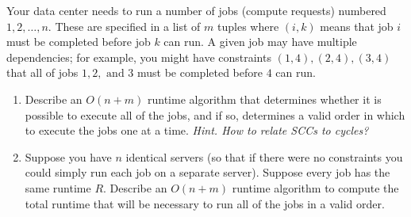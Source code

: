   \begin{exercise}
    Your data center needs to run a number of jobs (compute requests) numbered $1, 2, \dots, n$. These are specified in a list of $m$ tuples where $(i, k)$ means that job $i$ must be completed before job $k$ can run. A given job may have multiple dependencies; for example, you might have constraints $(1, 4), (2, 4), (3, 4)$ that all of jobs $1, 2, \mbox{ and } 3$ must be completed before $4$ can run.
    \begin{enumerate}
      \item Describe an $O(n+m)$ runtime algorithm that determines whether it is possible to execute all of the jobs, and if so, determines a valid order in which to execute the jobs one at a time. \textit{Hint. How to relate SCCs to cycles?}
      \item Suppose you have $n$ identical servers (so that if there were no constraints you could simply run each job on a separate server). Suppose every job has the same runtime $R$. Describe an $O(n+m)$ runtime algorithm to compute the total runtime that will be necessary to run all of the jobs in a valid order.
    \end{enumerate}
  \end{exercise}
